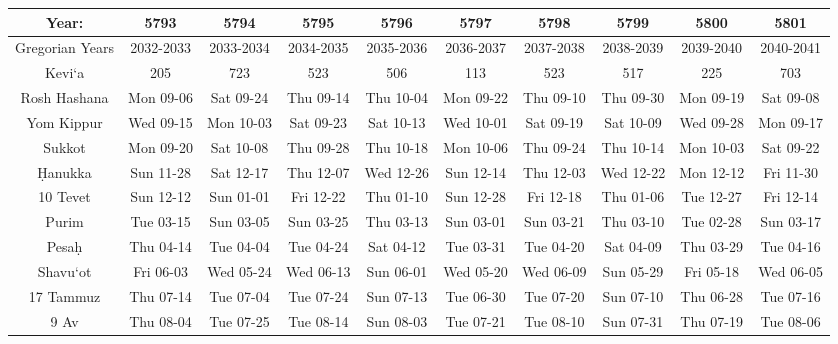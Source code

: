 \begin{footnotesize}
	\begin{tabular}{c | c | c | c | c | c | c | c | c | c}
		Year:&5793&5794&5795&5796&5797&5798&5799&5800&5801\\\hline
		Gregorian Years&2032-2033&2033-2034&2034-2035&2035-2036&2036-2037&2037-2038&2038-2039&2039-2040&2040-2041\\\hline
		Kevi`a&205&723&523&506&113&523&517&225&703\\\hline
		Rosh Hashana&Mon 09-06&Sat 09-24&Thu 09-14&Thu 10-04&Mon 09-22&Thu 09-10&Thu 09-30&Mon 09-19&Sat 09-08\\\hline
		Yom Kippur&Wed 09-15&Mon 10-03&Sat 09-23&Sat 10-13&Wed 10-01&Sat 09-19&Sat 10-09&Wed 09-28&Mon 09-17\\\hline
		Sukkot&Mon 09-20&Sat 10-08&Thu 09-28&Thu 10-18&Mon 10-06&Thu 09-24&Thu 10-14&Mon 10-03&Sat 09-22\\\hline
		\d{H}anukka&Sun 11-28&Sat 12-17&Thu 12-07&Wed 12-26&Sun 12-14&Thu 12-03&Wed 12-22&Mon 12-12&Fri 11-30\\\hline
		10 Tevet&Sun 12-12&Sun 01-01&Fri 12-22&Thu 01-10&Sun 12-28&Fri 12-18&Thu 01-06&Tue 12-27&Fri 12-14\\\hline
		Purim&Tue 03-15&Sun 03-05&Sun 03-25&Thu 03-13&Sun 03-01&Sun 03-21&Thu 03-10&Tue 02-28&Sun 03-17\\\hline
		Pesa\d{h}&Thu 04-14&Tue 04-04&Tue 04-24&Sat 04-12&Tue 03-31&Tue 04-20&Sat 04-09&Thu 03-29&Tue 04-16\\\hline
		Shavu`ot&Fri 06-03&Wed 05-24&Wed 06-13&Sun 06-01&Wed 05-20&Wed 06-09&Sun 05-29&Fri 05-18&Wed 06-05\\\hline
		17 Tammuz&Thu 07-14&Tue 07-04&Tue 07-24&Sun 07-13&Tue 06-30&Tue 07-20&Sun 07-10&Thu 06-28&Tue 07-16\\\hline
		9 Av&Thu 08-04&Tue 07-25&Tue 08-14&Sun 08-03&Tue 07-21&Tue 08-10&Sun 07-31&Thu 07-19&Tue 08-06\\\hline
\end{tabular}


\end{footnotesize}
